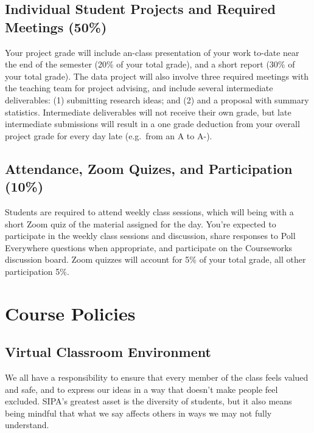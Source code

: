 \documentclass[11pt,]{article}
\begin{document}
\hypertarget{individual-student-projects-and-required-meetings-50}{%
\subsection{Individual Student Projects and Required Meetings
(50\%)}\label{individual-student-projects-and-required-meetings-50}}

Your project grade will include an-class presentation of your work
to-date near the end of the semester (20\% of your total grade), and a
short report (30\% of your total grade). The data project will also
involve three required meetings with the teaching team for project
advising, and include several intermediate deliverables: (1) submitting
research ideas; and (2) and a proposal with summary statistics.
Intermediate deliverables will not receive their own grade, but late
intermediate submissions will result in a one grade deduction from your
overall project grade for every day late (e.g.~from an A to A-).

\hypertarget{attendance-zoom-quizes-and-participation-10}{%
\subsection{Attendance, Zoom Quizes, and Participation
(10\%)}\label{attendance-zoom-quizes-and-participation-10}}

Students are required to attend weekly class sessions, which will being
with a short Zoom quiz of the material assigned for the day. You're
expected to participate in the weekly class sessions and discussion,
share responses to Poll Everywhere questions when appropriate, and
participate on the Courseworks discussion board. Zoom quizzes will
account for 5\% of your total grade, all other participation 5\%.

\hypertarget{course-policies}{%
\section{Course Policies}\label{course-policies}}

\hypertarget{virtual-classroom-environment}{%
\subsection{Virtual Classroom
Environment}\label{virtual-classroom-environment}}

We all have a responsibility to ensure that every member of the class
feels valued and safe, and to express our ideas in a way that doesn't
make people feel excluded. SIPA's greatest asset is the diversity of
students, but it also means being mindful that what we say affects
others in ways we may not fully understand.
\end{document}
